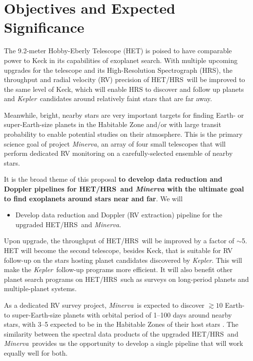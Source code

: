 \documentclass[12pt]{article}
\def\kepler{{\it Kepler}}
\def\minerva{{\it Minerva}}
\def\hrs{HET/HRS}
\begin{document}

\section{Objectives and Expected Significance}

The 9.2-meter Hobby-Eberly Telescope (HET) is poised to have comparable
power to Keck in its capabilities of exoplanet search. With multiple
upcoming upgrades for the telescope and its High-Resolution
Spectrograph (HRS), the throughput and radial velocity (RV) precision
of \hrs\ will be improved to the same level of Keck, which will enable
HRS to discover and follow up planets and \kepler\ candidates around
relatively faint stars that are far away.

Meanwhile, bright, nearby stars are very important targets for finding
Earth- or super-Earth-size planets in the Habitable Zone and/or with
large transit probability to enable potential studies on their
atmosphere. This is the primary science goal of project \minerva, an
array of four small telescopes that will perform dedicated RV
monitoring on a carefully-selected ensemble of nearby stars.

It is the broad theme of this proposal \textbf{to develop data
  reduction and Doppler pipelines for \hrs\ and \textit{Minerva} with
  the ultimate goal to find exoplanets around stars near and far}. We will
\begin{itemize}[leftmargin=2.2em]
    \vspace{-3pt}
\item Develop data reduction and Doppler (RV extraction) pipeline
  for the upgraded \hrs\ and \minerva.
    \vspace{-3pt}
\end{itemize}
Upon upgrade, the throughput of \hrs\ will be improved by a factor of
$\sim$5. HET will become the second telescope, besides Keck, that is
suitable for RV follow-up on the stars hosting planet candidates
discovered by \kepler. This will make the \kepler\ follow-up programs
more efficient. It will also benefit other planet search programs on
\hrs\ such as surveys on long-period planets and multiple-planet
systems.

As a dedicated RV survey project, \minerva\ is expected to discover
$\gtrsim 10$ Earth- to super-Earth-size planets with orbital period of
1--100 days around nearby stars, with 3--5 expected to be in the
Habitable Zones of their host stars
\citep{bottom2013,hogstrom2013}. The similarity between the spectral
data products of the upgraded \hrs\ and \minerva\ provides us the
opportunity to develop a single pipeline that will work equally well
for both.
\end{document}
